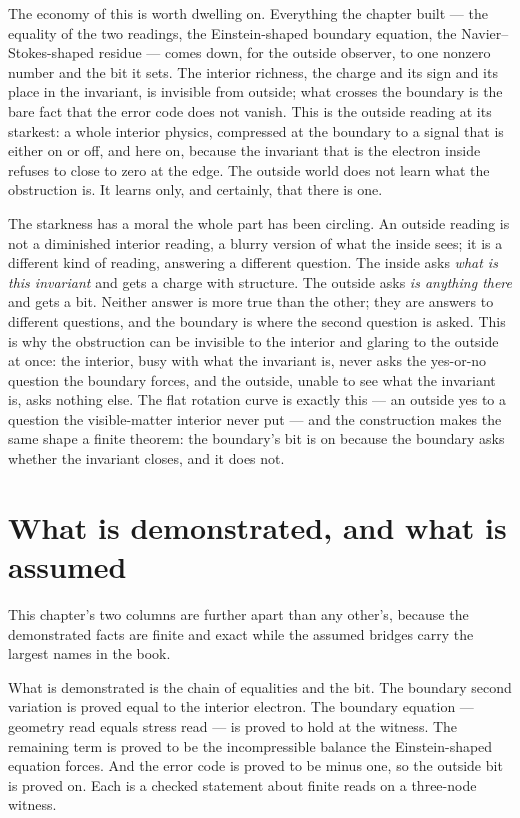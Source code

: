 The economy of this is worth dwelling on. Everything the chapter built --- the equality of the two
readings, the Einstein-shaped boundary equation, the Navier--Stokes-shaped residue --- comes down, for
the outside observer, to one nonzero number and the bit it sets. The interior richness, the charge and
its sign and its place in the invariant, is invisible from outside; what crosses the boundary is the bare
fact that the error code does not vanish. This is the outside reading at its starkest: a whole interior
physics, compressed at the boundary to a signal that is either on or off, and here on, because the
invariant that is the electron inside refuses to close to zero at the edge. The outside world does not
learn what the obstruction is. It learns only, and certainly, that there is one.

The starkness has a moral the whole part has been circling. An outside reading is not a diminished interior
reading, a blurry version of what the inside sees; it is a different kind of reading, answering a different
question. The inside asks \emph{what is this invariant} and gets a charge with structure. The outside asks
\emph{is anything there} and gets a bit. Neither answer is more true than the other; they are answers to
different questions, and the boundary is where the second question is asked. This is why the obstruction
can be invisible to the interior and glaring to the outside at once: the interior, busy with what the
invariant is, never asks the yes-or-no question the boundary forces, and the outside, unable to see what
the invariant is, asks nothing else. The flat rotation curve is exactly this --- an outside yes to a
question the visible-matter interior never put --- and the construction makes the same shape a finite
theorem: the boundary's bit is on because the boundary asks whether the invariant closes, and it does
not.

\section{What is demonstrated, and what is assumed}
\label{se:demonstrated-assumed-ch26}

This chapter's two columns are further apart than any other's, because the demonstrated facts are finite
and exact while the assumed bridges carry the largest names in the book.

What is demonstrated is the chain of equalities and the bit. The boundary second variation is proved
equal to the interior electron. The boundary equation --- geometry read equals stress read --- is proved
to hold at the witness. The remaining term is proved to be the incompressible balance the Einstein-shaped
equation forces. And the error code is proved to be minus one, so the outside bit is proved on. Each is a
checked statement about finite reads on a three-node witness.


